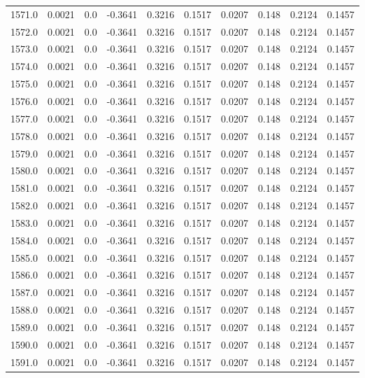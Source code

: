 \begin{longtable}{lrrrrrrrrr}
1571.0 & 0.0021 & 0.0 & -0.3641 & 0.3216 & 0.1517 & 0.0207 & 0.148 & 0.2124 & 0.1457 \\
1572.0 & 0.0021 & 0.0 & -0.3641 & 0.3216 & 0.1517 & 0.0207 & 0.148 & 0.2124 & 0.1457 \\
1573.0 & 0.0021 & 0.0 & -0.3641 & 0.3216 & 0.1517 & 0.0207 & 0.148 & 0.2124 & 0.1457 \\
1574.0 & 0.0021 & 0.0 & -0.3641 & 0.3216 & 0.1517 & 0.0207 & 0.148 & 0.2124 & 0.1457 \\
1575.0 & 0.0021 & 0.0 & -0.3641 & 0.3216 & 0.1517 & 0.0207 & 0.148 & 0.2124 & 0.1457 \\
1576.0 & 0.0021 & 0.0 & -0.3641 & 0.3216 & 0.1517 & 0.0207 & 0.148 & 0.2124 & 0.1457 \\
1577.0 & 0.0021 & 0.0 & -0.3641 & 0.3216 & 0.1517 & 0.0207 & 0.148 & 0.2124 & 0.1457 \\
1578.0 & 0.0021 & 0.0 & -0.3641 & 0.3216 & 0.1517 & 0.0207 & 0.148 & 0.2124 & 0.1457 \\
1579.0 & 0.0021 & 0.0 & -0.3641 & 0.3216 & 0.1517 & 0.0207 & 0.148 & 0.2124 & 0.1457 \\
1580.0 & 0.0021 & 0.0 & -0.3641 & 0.3216 & 0.1517 & 0.0207 & 0.148 & 0.2124 & 0.1457 \\
1581.0 & 0.0021 & 0.0 & -0.3641 & 0.3216 & 0.1517 & 0.0207 & 0.148 & 0.2124 & 0.1457 \\
1582.0 & 0.0021 & 0.0 & -0.3641 & 0.3216 & 0.1517 & 0.0207 & 0.148 & 0.2124 & 0.1457 \\
1583.0 & 0.0021 & 0.0 & -0.3641 & 0.3216 & 0.1517 & 0.0207 & 0.148 & 0.2124 & 0.1457 \\
1584.0 & 0.0021 & 0.0 & -0.3641 & 0.3216 & 0.1517 & 0.0207 & 0.148 & 0.2124 & 0.1457 \\
1585.0 & 0.0021 & 0.0 & -0.3641 & 0.3216 & 0.1517 & 0.0207 & 0.148 & 0.2124 & 0.1457 \\
1586.0 & 0.0021 & 0.0 & -0.3641 & 0.3216 & 0.1517 & 0.0207 & 0.148 & 0.2124 & 0.1457 \\
1587.0 & 0.0021 & 0.0 & -0.3641 & 0.3216 & 0.1517 & 0.0207 & 0.148 & 0.2124 & 0.1457 \\
1588.0 & 0.0021 & 0.0 & -0.3641 & 0.3216 & 0.1517 & 0.0207 & 0.148 & 0.2124 & 0.1457 \\
1589.0 & 0.0021 & 0.0 & -0.3641 & 0.3216 & 0.1517 & 0.0207 & 0.148 & 0.2124 & 0.1457 \\
1590.0 & 0.0021 & 0.0 & -0.3641 & 0.3216 & 0.1517 & 0.0207 & 0.148 & 0.2124 & 0.1457 \\
1591.0 & 0.0021 & 0.0 & -0.3641 & 0.3216 & 0.1517 & 0.0207 & 0.148 & 0.2124 & 0.1457 \\

\end{longtable}
